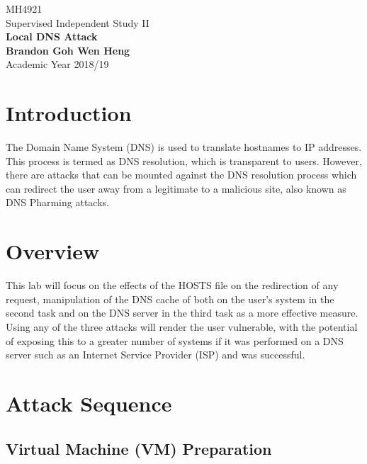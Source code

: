 \documentclass[a4paper,12pt]{article}
\begin{document}
	\begin{titlepage}
		\begin{center}
			\vspace*{9em}
			\Huge 
			MH4921\\ Supervised Independent Study II\\
			\vspace*{4em}
			\LARGE
			\textbf{Local DNS Attack}\\		
			\vspace{4em}
			\textbf{Brandon Goh Wen Heng}\\
			\vspace*{4em}
			Academic Year 2018/19
			\vfill
		\end{center}
	\end{titlepage}
	
	\tableofcontents
	\newpage
	\section{Introduction}
	The Domain Name System (DNS) is used to translate hostnames to IP addresses. This process is termed as DNS resolution, which is transparent to users. However, there are attacks that can be mounted against the DNS resolution process which can redirect the user away from a legitimate to a malicious site, also known as DNS Pharming attacks.
\section{Overview}
This lab will focus on the effects of the HOSTS file on the redirection of any request, manipulation of the DNS cache of both on the user's system in the second task and on the DNS server in the third task as a more effective measure. Using any of the three attacks will render the user vulnerable, with the potential of exposing this to a greater number of systems if it was performed on a DNS server such as an Internet Service Provider (ISP) and was successful.
\newpage
\section{Attack Sequence}
\subsection{Virtual Machine (VM) Preparation}
\end{document}
